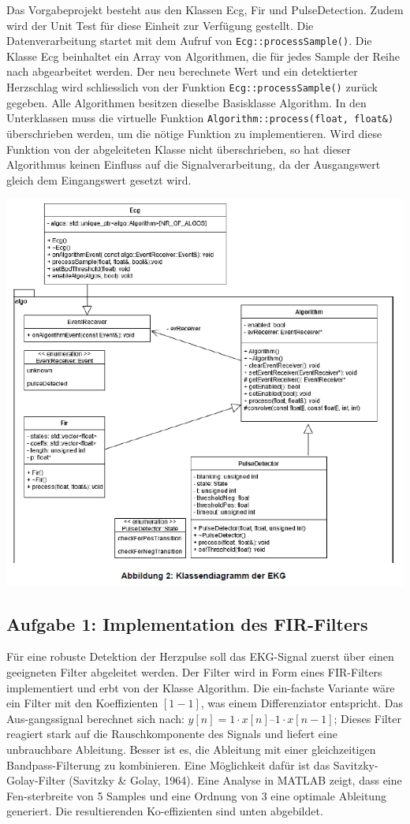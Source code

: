 Das Vorgabeprojekt besteht aus den Klassen Ecg, Fir und PulseDetection. Zudem wird der Unit Test für
diese Einheit zur Verfügung gestellt.
Die Datenverarbeitung startet mit dem Aufruf von \texttt{Ecg::processSample()}. Die Klasse Ecg beinhaltet ein
Array von Algorithmen, die für jedes Sample der Reihe nach abgearbeitet werden. Der neu berechnete Wert
und ein detektierter Herzschlag wird schliesslich von der Funktion \texttt{Ecg::processSample()} zurück gegeben.
Alle Algorithmen besitzen dieselbe Basisklasse Algorithm. In den Unterklassen muss die virtuelle Funktion
\texttt{Algorithm::process(float, float\&)} überschrieben werden, um die nötige Funktion zu implementieren.
Wird diese Funktion von der abgeleiteten Klasse nicht überschrieben, so hat dieser Algorithmus keinen Einfluss
auf die Signalverarbeitung, da der Ausgangswert gleich dem Eingangswert gesetzt wird.
\begin{center}
  \includegraphics[width=1\linewidth]{900-Praktika/prak08/2.PNG}
\end{center}

\subsection{Aufgabe 1: Implementation des FIR-Filters}
Für eine robuste Detektion der Herzpulse soll das EKG-Signal zuerst über einen geeigneten Filter abgeleitet werden. Der Filter wird in Form eines FIR-Filters implementiert und erbt von der Klasse Algorithm. Die ein-fachste Variante wäre ein Filter mit den Koeffizienten $[1 -1]$, was einem Differenziator entspricht. Das Aus-gangssignal berechnet sich nach: $y[n] = 1\cdot x[n] – 1 \cdot x[n-1]$;
Dieses Filter reagiert stark auf die Rauschkomponente des Signals und liefert eine unbrauchbare Ableitung. Besser ist es, die Ableitung mit einer gleichzeitigen Bandpass-Filterung zu kombinieren. Eine Möglichkeit dafür ist das Savitzky-Golay-Filter (Savitzky \& Golay, 1964). Eine Analyse in MATLAB zeigt, dass eine Fen-sterbreite von 5 Samples und eine Ordnung von 3 eine optimale Ableitung generiert. Die resultierenden Ko-effizienten sind unten abgebildet.


